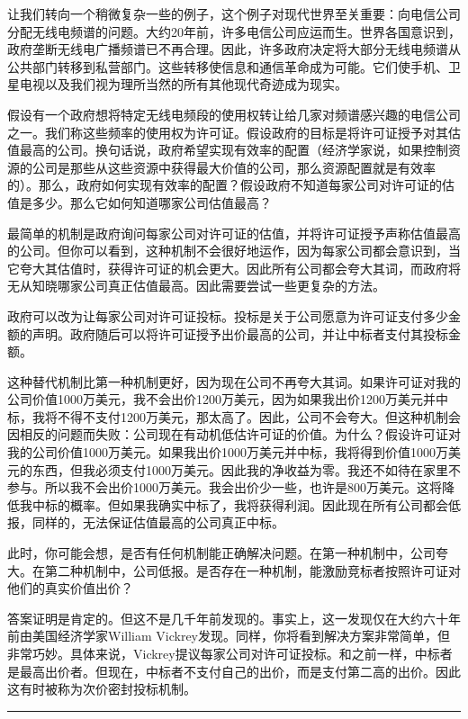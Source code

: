 \documentclass[12pt,a4paper]{article}
\newenvironment{translation}{%
  \par\vspace{2pt}\noindent%
  \color{transblue}%
  \ignorespaces
}{%
  \par\vspace{4pt}\hrule\vspace{6pt}%
}
\begin{document}
\begin{translation}
让我们转向一个稍微复杂一些的例子，这个例子对现代世界至关重要：向电信公司分配无线电频谱的问题。大约20年前，许多电信公司应运而生。世界各国意识到，政府垄断无线电广播频谱已不再合理。因此，许多政府决定将大部分无线电频谱从公共部门转移到私营部门。这些转移使信息和通信革命成为可能。它们使手机、卫星电视以及我们视为理所当然的所有其他现代奇迹成为现实。

假设有一个政府想将特定无线电频段的使用权转让给几家对频谱感兴趣的电信公司之一。我们称这些频率的使用权为许可证。假设政府的目标是将许可证授予对其估值最高的公司。换句话说，政府希望实现有效率的配置（经济学家说，如果控制资源的公司是那些从这些资源中获得最大价值的公司，那么资源配置就是有效率的）。那么，政府如何实现有效率的配置？假设政府不知道每家公司对许可证的估值是多少。那么它如何知道哪家公司估值最高？

最简单的机制是政府询问每家公司对许可证的估值，并将许可证授予声称估值最高的公司。但你可以看到，这种机制不会很好地运作，因为每家公司都会意识到，当它夸大其估值时，获得许可证的机会更大。因此所有公司都会夸大其词，而政府将无从知晓哪家公司真正估值最高。因此需要尝试一些更复杂的方法。

政府可以改为让每家公司对许可证投标。投标是关于公司愿意为许可证支付多少金额的声明。政府随后可以将许可证授予出价最高的公司，并让中标者支付其投标金额。

这种替代机制比第一种机制更好，因为现在公司不再夸大其词。如果许可证对我的公司价值1000万美元，我不会出价1200万美元，因为如果我出价1200万美元并中标，我将不得不支付1200万美元，那太高了。因此，公司不会夸大。但这种机制会因相反的问题而失败：公司现在有动机低估许可证的价值。为什么？假设许可证对我的公司价值1000万美元。如果我出价1000万美元并中标，我将得到价值1000万美元的东西，但我必须支付1000万美元。因此我的净收益为零。我还不如待在家里不参与。所以我不会出价1000万美元。我会出价少一些，也许是800万美元。这将降低我中标的概率。但如果我确实中标了，我将获得利润。因此现在所有公司都会低报，同样的，无法保证估值最高的公司真正中标。

此时，你可能会想，是否有任何机制能正确解决问题。在第一种机制中，公司夸大。在第二种机制中，公司低报。是否存在一种机制，能激励竞标者按照许可证对他们的真实价值出价？

答案证明是肯定的。但这不是几千年前发现的。事实上，这一发现仅在大约六十年前由美国经济学家William Vickrey发现。同样，你将看到解决方案非常简单，但非常巧妙。具体来说，Vickrey提议每家公司对许可证投标。和之前一样，中标者是最高出价者。但现在，中标者不支付自己的出价，而是支付第二高的出价。因此这有时被称为次价密封投标机制。


\end{translation}
\end{document}
